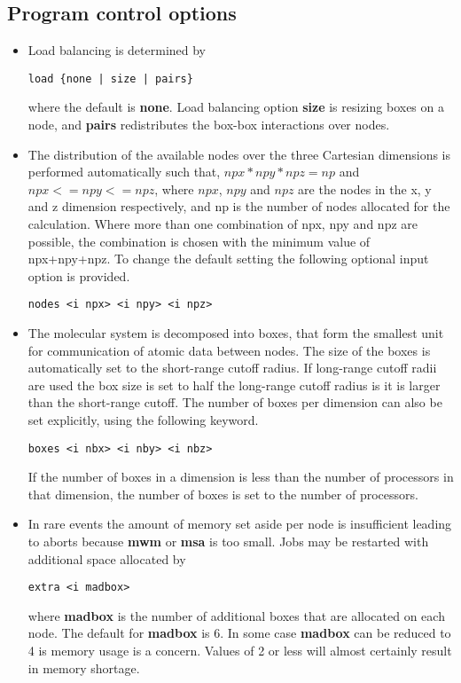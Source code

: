 \subsection{Program control options}
\begin{itemize}
\item
Load balancing is determined by
\begin{verbatim}
load {none | size | pairs}
\end{verbatim}
where the default is {\bf none}. Load balancing option {\bf size}
is resizing boxes on a node, and {\bf pairs} redistributes the
box-box interactions over nodes.
\item
The distribution of the available nodes over the three Cartesian
dimensions is performed automatically such that, $npx*npy*npz=np$
and $npx<=npy<=npz$, where $npx$, $npy$ and $npz$ are the nodes in the
x, y and z dimension respectively, and np is the number of nodes
allocated for the calculation. Where more than one combination
of npx, npy and npz are possible, the combination is chosen with
the minimum value of npx+npy+npz. To change the default setting
the following optional input option is provided.
\begin{verbatim}
nodes <i npx> <i npy> <i npz>
\end{verbatim}
\item
The molecular system is decomposed into boxes, that form the smallest
unit for communication of atomic data between nodes. The size of the
boxes is automatically set to the short-range cutoff radius. If
long-range cutoff radii  are used the box size is set to half the
long-range cutoff radius is it is larger than the short-range cutoff.
The number of boxes per dimension can also be set explicitly, using
the following keyword.
\begin{verbatim}
boxes <i nbx> <i nby> <i nbz>
\end{verbatim}
If the number of boxes in a dimension is less than the number of
processors in that dimension, the number of boxes is set to the number
of processors.
\item
In rare events the amount of memory set aside per node is insufficient
leading to aborts because {\bf mwm} or {\bf msa} is too small. Jobs
may be restarted with additional space allocated by
\begin{verbatim}
extra <i madbox>
\end{verbatim}
where {\bf madbox} is the number of additional boxes that are allocated
on each node. The default for {\bf madbox} is 6. In some case {\bf madbox}
can be reduced to 4 is memory usage is a concern. Values of 2 or less
will almost certainly result in memory shortage.
\end{itemize}
